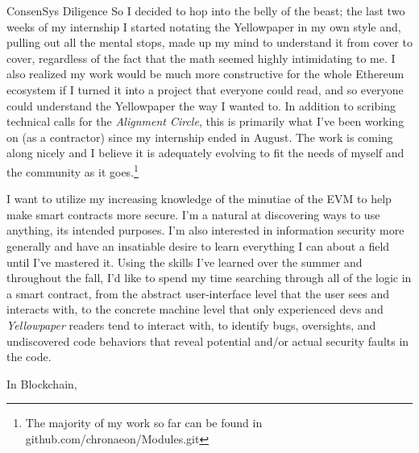 \documentclass[
	pagenumber=false, %
	parskip=half, %
	fromalign=right, %
	foldmarks=true, %
	addrfield=true %
	]{scrlttr2}
\begin{document}
\begin{letter}{ConsenSys Diligence}
	So I decided to hop into the belly of the beast; the last two weeks of my internship I started notating the Yellowpaper in my own style and, pulling out all the mental stops, made up my mind to understand it from cover to cover, regardless of the fact that the math seemed highly intimidating to me. I also realized my work would be much more constructive for the whole Ethereum ecosystem if I turned it into a project that everyone could read, and so everyone could understand the Yellowpaper the way I wanted to. In addition to scribing technical calls for the \textit{Alignment Circle}, this is primarily what I've been working on (as a contractor) since my internship ended in August. The work is coming along nicely and I believe it is adequately evolving to fit the needs of myself and the community as it goes.\footnote{The majority of my work so far can be found in github.com/chronaeon/Modules.git} 

	I want to utilize my increasing knowledge of the minutiae of the EVM to help make smart contracts more secure. I'm a natural at discovering ways to use anything, its intended purposes. I'm also interested in information security more generally and have an insatiable desire to learn everything I can about a field until I've  mastered it. Using the skills I've learned over the summer and throughout the fall, I'd like to spend my time searching through all of the logic in a smart contract, from the abstract user-interface level that the user sees and interacts with, to the concrete machine level that only experienced devs and \textit{Yellowpaper} readers tend to interact with, to identify bugs, oversights, and undiscovered code behaviors that reveal  potential and/or actual security faults in the code. 

\closing{In Blockchain,}



\end{letter}
 
\end{document}
